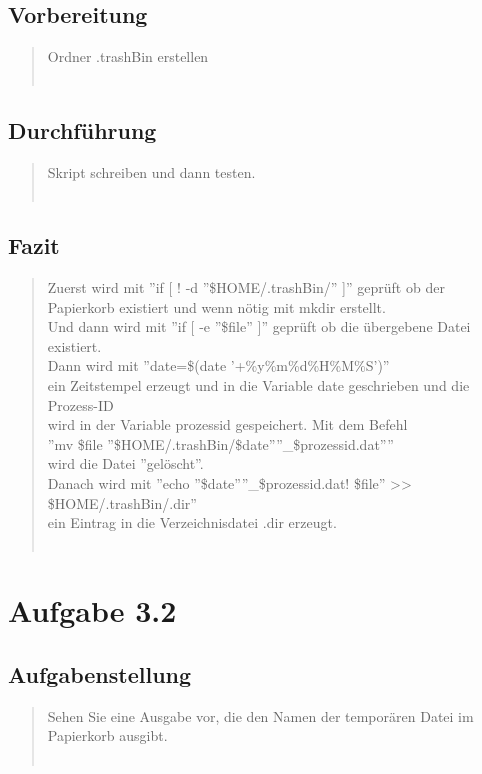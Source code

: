 	\subsection{Vorbereitung}
		\begin{quote}
			Ordner .trashBin erstellen\\ \\
		\end{quote}
	\subsection{Durchführung}
		\begin{quote}
			Skript schreiben und dann testen.\\ \\
		\end{quote}
	\subsection{Fazit}
		\begin{quote}
			Zuerst wird mit ''if {[} ! -d ''\$HOME/.trashBin/'' {]}'' gepr\"uft ob der Papierkorb existiert und wenn n\"otig mit mkdir erstellt.\\
			Und dann wird mit ''if {[} -e ''\$file'' {]}'' gepr\"uft ob die \"ubergebene Datei existiert.\\
			Dann wird mit ''date=\$(date '+\%y\%m\%d\%H\%M\%S')''\\
			ein Zeitstempel erzeugt und in die Variable date geschrieben und die Prozess-ID\\
			wird in der Variable prozessid gespeichert. Mit dem Befehl\\
			''mv \$file ''\$HOME/.trashBin/\$date''''\_\$prozessid.dat''''\\
			wird die Datei ''gel\"oscht''.\\
			Danach wird mit	''echo ''\$date''''\_\$prozessid.dat! \$file'' >> \$HOME/.trashBin/.dir''\\
			ein Eintrag in die Verzeichnisdatei .dir erzeugt.\\ \\
		\end{quote}

\section{Aufgabe 3.2}
	\subsection{Aufgabenstellung}
		\begin{quote}
			Sehen Sie eine Ausgabe vor, die den Namen der tempor\"aren Datei im Papierkorb ausgibt.\\ \\
		\end{quote}
